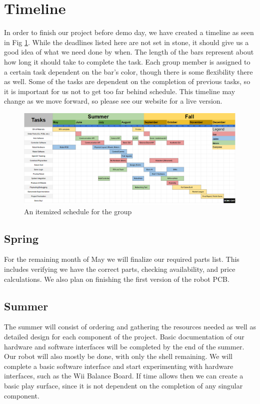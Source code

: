 \documentclass[11pt]{ieeeconf}
\begin{document}
\section{Timeline}
In order to finish our project before demo day, we have created a timeline as seen in Fig \ref{schedule}. While the deadlines listed here are not set in stone, it should give us a good idea of what we need done by when. The length of the bars represent about how long it should take to complete the task. Each group member is assigned to a certain task dependent on the bar's color, though there is some flexibility there as well. Some of the tasks are dependent on the completion of previous tasks, so it is important for us not to get too far behind schedule. This timeline may change as we move forward, so please see our website for a live version.

 \begin{figure}[!t]
  \centering
  \captionsetup{justification=centering}
      \includegraphics[width=\textwidth]{images/schedule.png}
        \caption{An itemized schedule for the group}
        \label{schedule}
\end{figure}

\subsection{Spring}
For the remaining month of May we will finalize our required parts list. This includes verifying we have the correct parts, checking availability, and price calculations. We also plan on finishing the first version of the robot PCB.

\subsection{Summer}
The summer will consist of ordering and gathering the resources needed as well as detailed design for each component of the project. Basic documentation of our hardware and software interfaces will be completed by the end of the summer. Our robot will also mostly be done, with only the shell remaining. We will complete a basic software interface and start experimenting with hardware interfaces, such as the Wii Balance Board. If time allows then we can create a basic play surface, since it is not dependent on the completion of any singular component.
\end{document}
